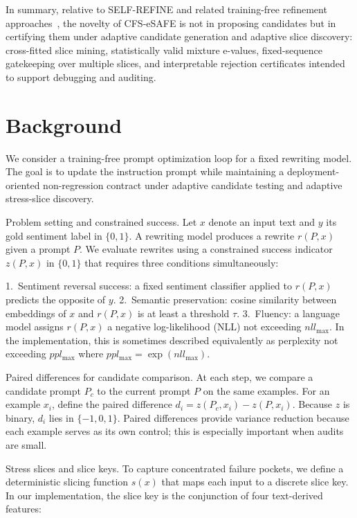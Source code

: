 \documentclass{article} %
\begin{document}
In summary, relative to SELF-REFINE and related training-free refinement approaches~\cite{madaan-2023-self}, the novelty of CFS-eSAFE is not in proposing candidates but in certifying them under adaptive candidate generation and adaptive slice discovery: cross-fitted slice mining, statistically valid mixture e-values, fixed-sequence gatekeeping over multiple slices, and interpretable rejection certificates intended to support debugging and auditing.

\section{Background}\label{sec:background}
We consider a training-free prompt optimization loop for a fixed rewriting model. The goal is to update the instruction prompt while maintaining a deployment-oriented non-regression contract under adaptive candidate testing and adaptive stress-slice discovery.

Problem setting and constrained success. Let $x$ denote an input text and $y$ its gold sentiment label in $\{0, 1\}$. A rewriting model produces a rewrite $r(P, x)$ given a prompt $P$. We evaluate rewrites using a constrained success indicator $z(P, x)$ in $\{0, 1\}$ that requires three conditions simultaneously:

1.~Sentiment reversal success: a fixed sentiment classifier applied to $r(P, x)$ predicts the opposite of $y$.
2.~Semantic preservation: cosine similarity between embeddings of $x$ and $r(P, x)$ is at least a threshold $\tau$.
3.~Fluency: a language model assigns $r(P, x)$ a negative log-likelihood (NLL) not exceeding $nll_{\max}$. In the implementation, this is sometimes described equivalently as perplexity not exceeding $ppl_{\max}$ where $ppl_{\max} = \exp(nll_{\max})$.

Paired differences for candidate comparison. At each step, we compare a candidate prompt $P_c$ to the current prompt $P$ on the same examples. For an example $x_i$, define the paired difference $d_i = z(P_c, x_i) - z(P, x_i)$. Because $z$ is binary, $d_i$ lies in $\{-1, 0, 1\}$. Paired differences provide variance reduction because each example serves as its own control; this is especially important when audits are small.

Stress slices and slice keys. To capture concentrated failure pockets, we define a deterministic slicing function $s(x)$ that maps each input to a discrete slice key. In our implementation, the slice key is the conjunction of four text-derived features:
\end{document}
